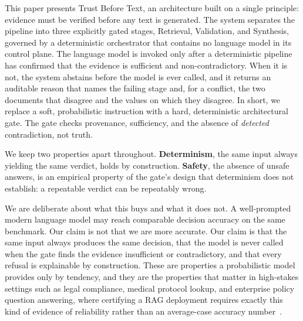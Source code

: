 \documentclass[conference]{IEEEtran}
\begin{document}
This paper presents Trust Before Text, an architecture built on a single
principle: evidence must be verified before any text is generated. The
system separates the pipeline into three explicitly gated stages,
Retrieval, Validation, and Synthesis, governed by a deterministic
orchestrator that contains no language model in its control plane. The
language model is invoked only after a deterministic pipeline has confirmed
that the evidence is sufficient and non-contradictory. When it is not, the
system abstains before the model is ever called, and it returns an
auditable reason that names the failing stage and, for a conflict, the two
documents that disagree and the values on which they disagree. In short, we
replace a soft, probabilistic instruction with a hard, deterministic
architectural gate. The gate checks provenance, sufficiency, and the
absence of \textit{detected} contradiction, not truth.

We keep two properties apart throughout. \textbf{Determinism}, the same
input always yielding the same verdict, holds by construction.
\textbf{Safety}, the absence of unsafe answers, is an empirical property of
the gate's design that determinism does not establish: a repeatable verdict
can be repeatably wrong.

We are deliberate about what this buys and what it does not. A well-prompted
modern language model may reach comparable decision accuracy on the same
benchmark. Our claim is not that we are more accurate. Our claim is that the
same input always produces the same decision, that the model is never
called when the gate finds the evidence insufficient or contradictory, and
that every refusal is explainable by construction. These are
properties a probabilistic model provides only by tendency, and they are the
properties that matter in high-stakes settings such as legal compliance,
medical protocol lookup, and enterprise policy question answering, where
certifying a RAG deployment requires exactly this kind of evidence of
reliability rather than an average-case accuracy
number~\cite{shan2024certifying}.
\end{document}

